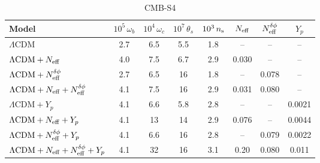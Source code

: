 \begin{subappendices}
\begin{table}
\begin{subtable}{\textwidth}
		\begin{tabular}{l c c c c c c c}
				\toprule
			Model											& {$10^{5}\,\omega_b$}	& {$10^{4}\,\omega_c$}	& {$10^{7}\,\theta_s$}	& {$10^{3}\,n_\mathrm{s}$}	& {$N_\mathrm{eff}$}	& {$N_\mathrm{eff}^{\delta\phi}$}	& {$Y_p$}	\\
				\midrule[0.065em]
			$\Lambda\mathrm{CDM}$							& 2.7						& 6.5						& 5.5						& 1.8				& {--}		& {--}			& {--}		\\
			$\Lambda\mathrm{CDM} + N_\mathrm{eff}$					& 4.0						& 7.5						& 6.7						& 2.9				& 0.030		& {--} 			& {--}		\\
			$\Lambda\mathrm{CDM} + N_\mathrm{eff}^{\delta\phi}$					& 2.7						& 6.5						& 16						& 1.8				& {--}		& 0.078			& {--}		\\
			$\Lambda\mathrm{CDM} + N_\mathrm{eff} + N_\mathrm{eff}^{\delta\phi}$			& 4.1						& 7.5						& 16						& 2.9				& 0.031		& 0.080			& {--}		\\
			$\Lambda\mathrm{CDM} + Y_p$						& 4.1						& 6.6						& 5.8						& 2.8				& {--}		& {--}			& 0.0021	\\
			$\Lambda\mathrm{CDM} + N_\mathrm{eff} + Y_p$				& 4.1						& 13						& 14						& 2.9				& 0.076		& {--}			& 0.0044	\\
			$\Lambda\mathrm{CDM} + N_\mathrm{eff}^{\delta\phi} + Y_p$			& 4.1						& 6.6						& 16						& 2.8				& {--}		& 0.079			& 0.0022	\\
			$\Lambda\mathrm{CDM} + N_\mathrm{eff} + N_\mathrm{eff}^{\delta\phi} + Y_p$	& 4.1						& 32						& 16						& 3.1				& 0.20		& 0.080			& 0.011		\\
				\bottomrule
		\end{tabular}
	
		\caption{CMB-S4}
\end{subtable}\\[4pt]
	\begin{subtable}{\textwidth}
		\centering


\end{subtable}
\end{table}
\end{subappendices}
